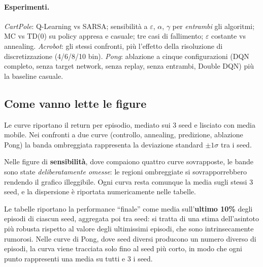 \paragraph{Esperimenti.} \emph{CartPole}: Q\hbox{-}Learning vs SARSA; sensibilit\`a a
$\varepsilon$, $\alpha$, $\gamma$ per \emph{entrambi} gli algoritmi; MC vs
TD(0) su policy appresa e casuale; tre casi di fallimento; $\varepsilon$ costante vs
annealing. \emph{Acrobot}: gli stessi confronti, pi\`u l'effetto della risoluzione di
discretizzazione (4/6/8/10 bin). \emph{Pong}: ablazione a cinque configurazioni (DQN
completo, senza target network, senza replay, senza entrambi, Double DQN) pi\`u la
baseline casuale.

\subsection{Come vanno lette le figure}
\label{sec:experiments-reading}
Le curve riportano il return per episodio, mediato sui 3 seed e lisciato con media
mobile. Nei confronti a due curve (controllo, annealing, predizione, ablazione Pong) la
banda ombreggiata rappresenta la deviazione standard $\pm 1\sigma$ tra i seed.

Nelle figure di \textbf{sensibilit\`a}, dove compaiono quattro curve sovrapposte, le
bande sono state \emph{deliberatamente omesse}: le regioni ombreggiate si
sovrapporrebbero rendendo il grafico illeggibile. Ogni curva resta comunque la media
sugli stessi 3 seed, e la dispersione \`e riportata numericamente nelle tabelle.

Le tabelle riportano la performance ``finale'' come media sull'\textbf{ultimo 10\%} degli
episodi di ciascun seed, aggregata poi tra seed: si tratta di una stima dell'asintoto
pi\`u robusta rispetto al valore degli ultimissimi episodi, che sono intrinsecamente
rumorosi. Nelle curve di Pong, dove seed diversi producono un numero diverso di episodi,
la curva viene tracciata solo fino al seed pi\`u corto, in modo che ogni punto
rappresenti una media su tutti e 3 i seed.
